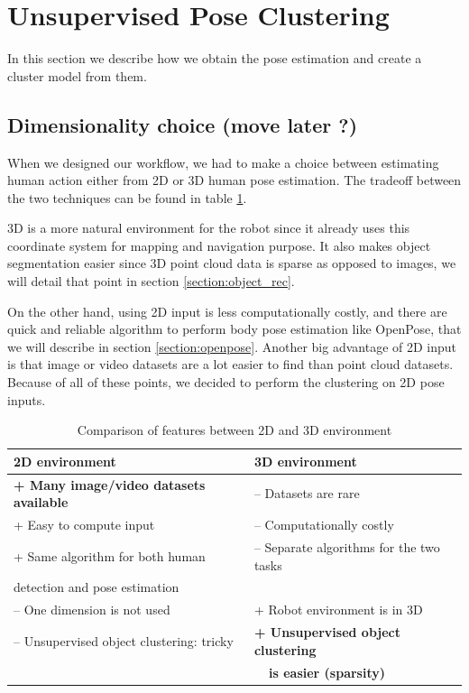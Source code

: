 \section{Unsupervised Pose Clustering}
In this section we describe how we obtain the pose estimation and create a cluster model from them.

\subsection{Dimensionality choice (move later ?)}
When we designed our workflow, we had to make a choice between estimating human action either from 2D or 3D human pose estimation. The tradeoff between the two techniques can be found in table \ref{tab:dimension_comparison}.

3D is a more natural environment for the robot since it already uses this coordinate system for mapping and navigation purpose. It also makes object segmentation easier since 3D point cloud data is sparse as opposed to images, we will detail that point in section \ref{section:object_rec}.

On the other hand, using 2D input is less computationally costly, and there are quick and reliable algorithm to perform body pose estimation like OpenPose, that we will describe in section \ref{section:openpose}. Another big advantage of 2D input is that image or video datasets are a lot easier to find than point cloud datasets. Because of all of these points, we decided to perform the clustering on 2D pose inputs.

\begin{table}[h]
    \centering
    \caption{Comparison of features between 2D and 3D environment}
    \label{tab:dimension_comparison}
    \begin{tabular}{|l|l|}
        \hline
        2D environment & 3D environment \\ \hline
        \textbf{+ Many image/video datasets available} & -- Datasets are rare \\
        + Easy to compute input & -- Computationally costly \\
        + Same algorithm for both human & -- Separate algorithms for the two tasks \\ detection and pose estimation & \\
        -- One dimension is not used & + Robot environment is in 3D \\
        -- Unsupervised object clustering: tricky & \textbf{+ Unsupervised object clustering} \\
        & \textbf{~~is easier (sparsity)}
        \\ \hline
    \end{tabular}
\end{table}

